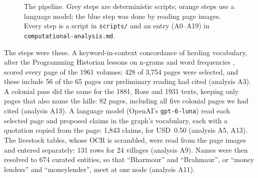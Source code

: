 \documentclass[10pt,a4paper,twocolumn]{article}
\newcommand{\an}[1]{(analysis #1)}
\begin{document}
\begin{figure}[!t]
\centering
{}
\caption{The pipeline. Grey steps are deterministic scripts; orange steps use a language model; the blue step was done by reading page images. Every step is a script in \texttt{scripts/} and an entry (A0--A19) in \texttt{computational-analysis.md}.}
\label{fig:pipeline}
\end{figure}

The steps were these. A keyword-in-context concordance of herding vocabulary, after the Programming Historian lessons on n-grams and word frequencies \citep{ph-kwic}, scored every page of the 1961 volumes; 428 of 3,754 pages were selected, and these include 56 of the 65 pages our preliminary reading had cited \an{A3}. A colonial pass did the same for the 1881, Rose and 1931 texts, keeping only pages that also name the hills: 82 pages, including all five colonial pages we had cited \an{A13}. A language model (OpenAI's \texttt{gpt-6-luna}) read each selected page and proposed claims in the graph's vocabulary, each with a quotation copied from the page: 1,843 claims, for USD~0.50 \an{A5, A13}. The livestock tables, whose OCR is scrambled, were read from the page images and entered separately: 131 rows for 24 villages \an{A9}. Names were then resolved to 674 curated entities, so that \enquote{Bharmour} and \enquote{Brahmaur}, or \enquote{money lenders} and \enquote{moneylender}, meet at one node \an{A11}.
\end{document}
